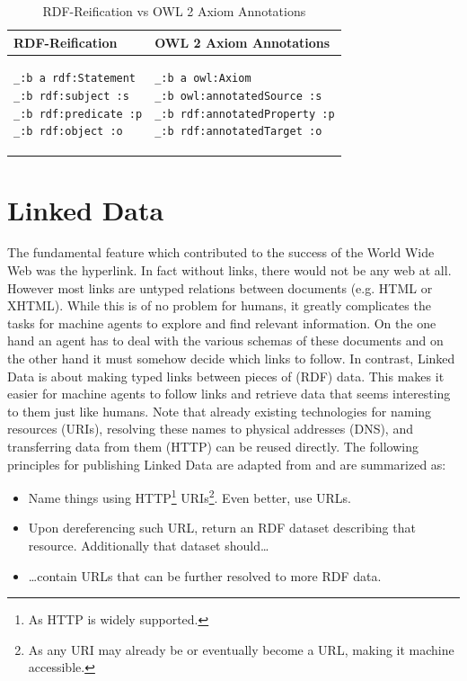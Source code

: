 \begin{table}[!h]
\centering
\begin{tabular}{ll}
\toprule
RDF-Reification & OWL 2 Axiom Annotations \\
\midrule
\begin{minipage}{5cm}
\begin{lstlisting}[language=turtle]
_:b a rdf:Statement
_:b rdf:subject :s
_:b rdf:predicate :p
_:b rdf:object :o
\end{lstlisting}
\end{minipage}
&
\begin{minipage}{5cm}
\begin{lstlisting}[language=turtle]
_:b a owl:Axiom
_:b owl:annotatedSource :s
_:b rdf:annotatedProperty :p
_:b rdf:annotatedTarget :o
\end{lstlisting}
\end{minipage}
\\
\bottomrule
\end{tabular}
\caption{RDF-Reification vs OWL 2 Axiom Annotations}
\label{tab:ReificationVsAnntations}
\end{table}


\section{Linked Data}
The fundamental feature which contributed to the success of the World Wide Web
was the hyperlink. In fact without links, there would not be any web at all.
However most links are untyped relations between documents (e.g. HTML or XHTML).
While this is of no problem for humans, it greatly complicates the tasks for
machine agents to explore and find relevant information. On
the one hand an agent has to deal with the various schemas of these documents
and on the other hand it must somehow decide which links to follow.
In contrast, Linked Data is about making typed links between pieces of
(RDF) data.
This makes it easier for machine agents to follow links and
retrieve data that seems interesting to them just like humans.
Note that already existing technologies for
naming resources (URIs), resolving these names to physical addresses (DNS),
and transferring data from them (HTTP)
can be reused directly. The following principles for publishing Linked Data
are adapted from \cite{LinkedDataDesignIssues} and are summarized as:
\begin{itemize}
\item Name things using
HTTP\footnote{As HTTP is widely supported.}
URIs\footnote{As any URI may already be or eventually become a URL, making it
machine accessible.}. Even better, use URLs.
\item Upon dereferencing such URL, return an RDF dataset describing that
resource. Additionally that dataset should\ldots
\item \ldots contain URLs that can be further resolved to more RDF data.
\end{itemize}

